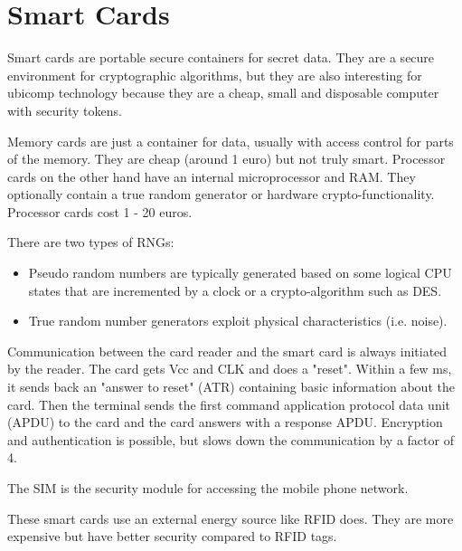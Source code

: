 \section{Smart Cards}

\begin{mytitle} Smart cards are portable secure containers for secret data. They are a secure environment for cryptographic algorithms, but they are also interesting for ubicomp technology because they are a cheap, small and disposable computer with security tokens. 
\end{mytitle}
\begin{mytitle} Memory cards are just a container for data, usually with access control for parts of the memory. They are cheap (around 1 euro) but not truly smart. Processor cards on the other hand have an internal microprocessor and RAM. They optionally contain a true random generator or hardware crypto-functionality. Processor cards cost 1 - 20 euros.
\end{mytitle}

\begin{mytitle} There are two types of RNGs:
\begin{itemize}
    \item Pseudo random numbers are typically generated based on some logical CPU states that are incremented by a clock or a crypto-algorithm such as DES.
    \item True random number generators exploit physical characteristics (i.e. noise).
\end{itemize}
\end{mytitle}
\begin{mytitle} Communication between the card reader and the smart card is always initiated by the reader. The card gets Vcc and CLK and does a "reset". Within a few ms, it sends back an "answer to reset" (ATR) containing basic information about the card. Then the terminal sends the first command application protocol data unit (APDU) to the card and the card answers with a response APDU. Encryption and authentication is possible, but slows down the communication by a factor of 4.
\end{mytitle}
\begin{mytitle} The SIM is the security module for accessing the mobile phone network.
\end{mytitle}
\begin{mytitle} These smart cards use an external energy source like RFID does. They are more expensive but have better security compared to RFID tags.
\end{mytitle}
